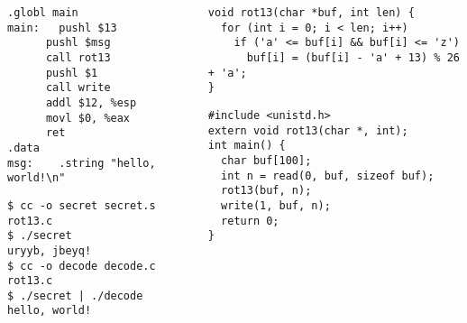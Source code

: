 \begin{columns}
  \begin{column}{0.41\textwidth}
    \vspace{-0.8em}
    \begin{verbatim}
.globl main
main:   pushl $13
      pushl $msg
      call rot13
      pushl $1
      call write
      addl $12, %esp
      movl $0, %eax
      ret
.data
msg:    .string "hello, world!\n"
    \end{verbatim}
    \begin{verbatim}
$ cc -o secret secret.s rot13.c
$ ./secret
uryyb, jbeyq!
$ cc -o decode decode.c rot13.c
$ ./secret | ./decode
hello, world!
    \end{verbatim}
  \end{column}
  \begin{column}{0.595\textwidth}
    \vspace{-0.8em}
    \begin{verbatim}
void rot13(char *buf, int len) {
  for (int i = 0; i < len; i++)
    if ('a' <= buf[i] && buf[i] <= 'z')
      buf[i] = (buf[i] - 'a' + 13) % 26 + 'a';
}
    \end{verbatim}
    \vspace{1em}
    \vspace{-0.8em}
    \begin{verbatim}
#include <unistd.h>
extern void rot13(char *, int);
int main() {
  char buf[100];
  int n = read(0, buf, sizeof buf);
  rot13(buf, n);
  write(1, buf, n);
  return 0;
}
    \end{verbatim}
  \end{column}
\end{columns}

